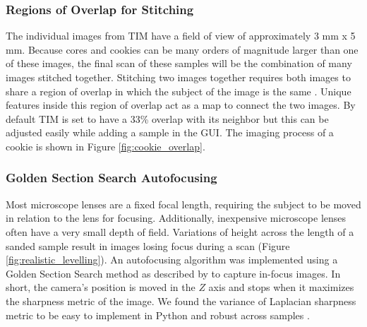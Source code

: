 \documentclass[a4paper,12pt]{article}
\newcommand{\R}[1]{\label{#1}\linelabel{#1}}
\begin{document}
\subsubsection{Regions of Overlap for Stitching}

The individual images from TIM have a field of view of approximately 3 mm x 5 mm. Because cores and cookies can be many orders of magnitude larger than one of these images, the final scan of these samples will be the combination of many images stitched together.
Stitching two images together requires both images to share a region of overlap in which the subject of the image is the same \citep{mohammadi_comparative_2024}.
Unique features inside this region of overlap act as a map to connect the two images.
By default TIM is set to have a 33\% overlap with its neighbor but this can be adjusted easily while adding a sample in the GUI. The imaging process of a cookie is shown in Figure \ref{fig:cookie_overlap}.


\subsubsection{Golden Section Search Autofocusing}

Most microscope lenses are a fixed focal length, requiring the subject to be moved in relation to the lens for focusing. Additionally, inexpensive microscope lenses often have a very small depth of field. 
Variations of height across the length of a sanded sample result in images losing focus during a scan (Figure \ref{fig:realistic_levelling}). 
An autofocusing algorithm was implemented using a Golden Section Search method as described by \citet{gu_region_2015} to capture in-focus images.\R{line_change_3} In short, the camera's position is moved in the $Z$ axis and stops when it maximizes the sharpness metric of the image. 
We found the variance of Laplacian sharpness metric to be easy to implement in Python and robust across samples \citep{pech-pacheco_diatom_2000}. 
\end{document}
